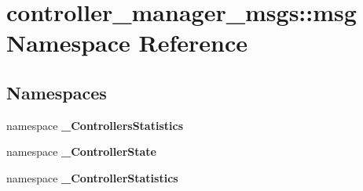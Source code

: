 \section{controller\-\_\-manager\-\_\-msgs\-:\-:msg \-Namespace \-Reference}
\label{namespacecontroller__manager__msgs_1_1msg}
\subsection*{\-Namespaces}
\begin{DoxyCompactItemize}
\item 
namespace {\bf \-\_\-\-Controllers\-Statistics}
\item 
namespace {\bf \-\_\-\-Controller\-State}
\item 
namespace {\bf \-\_\-\-Controller\-Statistics}
\end{DoxyCompactItemize}
